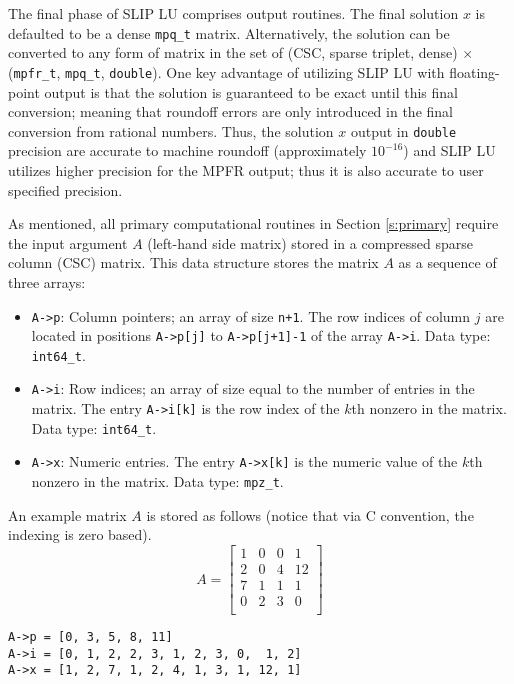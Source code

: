 \documentclass[12pt]{article}
\theoremstyle{definition}
\begin{document}
The final phase of SLIP LU comprises output routines. The final solution $x$
is defaulted to be a dense \verb|mpq_t| matrix. Alternatively, the solution
can be converted to any form of matrix in the set of (CSC, sparse triplet,
dense) $\times$ (\verb|mpfr_t|, \verb|mpq_t|, \verb|double|). One key
advantage of utilizing SLIP LU with floating-point output is that the solution
is guaranteed to be exact until this final conversion; meaning that roundoff
errors are only introduced in the final conversion from rational numbers. Thus,
the solution $x$ output in \verb|double| precision are accurate to machine
roundoff (approximately $10^{-16}$) and SLIP LU utilizes higher precision for
the MPFR output; thus it is also accurate to user specified precision.

As mentioned, all primary computational routines in Section \ref{s:primary}
require the input argument $A$ (left-hand side matrix) stored in a compressed
sparse column (CSC) matrix. This data structure
stores the matrix $A$ as a sequence of three arrays:

\begin{itemize}
\item
\verb|A->p|: Column pointers; an array of size \verb|n+1|. The row indices of
column $j$ are located in positions \verb|A->p[j]| to \verb|A->p[j+1]-1| of the
array \verb|A->i|. Data type: \verb|int64_t|.

\item
\verb|A->i|: Row indices; an array of size equal to the number of entries in
the matrix. The entry \verb|A->i[k]| is the row index of the $k$th nonzero in
the matrix. Data type: \verb|int64_t|.

\item
\verb|A->x|: Numeric entries. The entry \verb|A->x[k]| is the numeric value of
the $k$th nonzero in the matrix. Data type: \verb|mpz_t|.
\end{itemize}

An example matrix $A$ is stored as follows (notice that via C convention, the
indexing is zero based).
\[
A = \begin{bmatrix}
1 & 0 & 0 & 1 \\
2 & 0 & 4 & 12 \\
7 & 1 & 1 & 1 \\
0 & 2 & 3 & 0 \\
\end{bmatrix}
\]

{\small
\noindent \verb|A->p = [0, 3, 5, 8, 11]| \\
\verb|A->i = [0, 1, 2, 2, 3, 1, 2, 3, 0,  1, 2]| \\
\verb|A->x = [1, 2, 7, 1, 2, 4, 1, 3, 1, 12, 1]|
}
\end{document}
